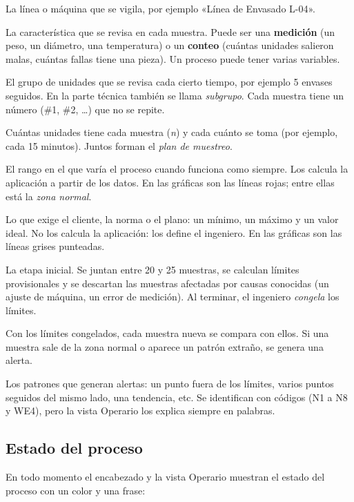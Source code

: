 \documentclass[11pt,a4paper]{article}
\newcommand{\campo}[1]{«#1»}                             %
\begin{document}
\begin{description}[style=nextline,leftmargin=1.5em,itemsep=0.4em]
\item[Proceso] La línea o máquina que se vigila, por ejemplo \campo{Línea de Envasado L-04}.
\item[Variable] La característica que se revisa en cada muestra. Puede ser una
  \textbf{medición} (un peso, un diámetro, una temperatura) o un \textbf{conteo} (cuántas unidades
  salieron malas, cuántas fallas tiene una pieza). Un proceso puede tener varias variables.
\item[Muestra] El grupo de unidades que se revisa cada cierto tiempo, por ejemplo 5 envases
  seguidos. En la parte técnica también se llama \emph{subgrupo}. Cada muestra tiene un número
  (\#1, \#2, \ldots) que no se repite.
\item[Tamaño de muestra y frecuencia] Cuántas unidades tiene cada muestra (\emph{n}) y cada cuánto
  se toma (por ejemplo, cada 15 minutos). Juntos forman el \emph{plan de muestreo}.
\item[Límites de control] El rango en el que varía el proceso cuando funciona como siempre. Los
  calcula la aplicación a partir de los datos. En las gráficas son las líneas rojas; entre ellas
  está la \emph{zona normal}.
\item[Valores aceptados (especificación)] Lo que exige el cliente, la norma o el plano: un mínimo,
  un máximo y un valor ideal. No los calcula la aplicación: los define el ingeniero. En las
  gráficas son las líneas grises punteadas.
\item[Fase I: conociendo el proceso] La etapa inicial. Se juntan entre 20 y 25 muestras, se
  calculan límites provisionales y se descartan las muestras afectadas por causas conocidas
  (un ajuste de máquina, un error de medición). Al terminar, el ingeniero \emph{congela} los
  límites.
\item[Fase II: monitoreo] Con los límites congelados, cada muestra nueva se compara con ellos. Si
  una muestra sale de la zona normal o aparece un patrón extraño, se genera una alerta.
\item[Reglas de detección] Los patrones que generan alertas: un punto fuera de los límites, varios
  puntos seguidos del mismo lado, una tendencia, etc. Se identifican con códigos (N1 a N8 y WE4),
  pero la vista Operario los explica siempre en palabras.
\end{description}

\subsection{Estado del proceso}
En todo momento el encabezado y la vista Operario muestran el estado del proceso con un color y
una frase:
\end{document}
